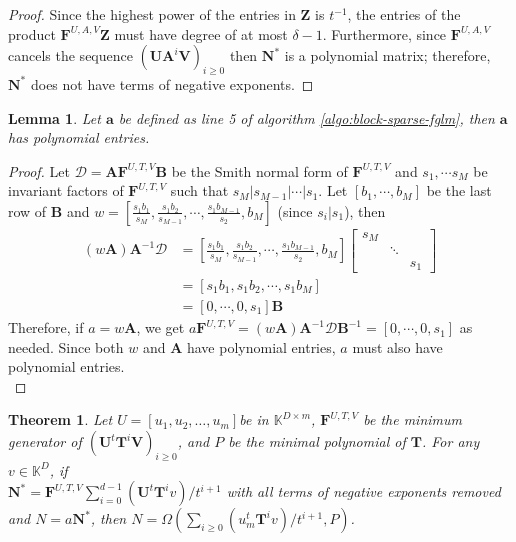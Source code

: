 \documentclass[12pt]{article}
\newtheorem{Lemma}{Lemma}
\def\K {\ensuremath{\mathbb{K}}}
\newtheorem{theorem}[definition]{Theorem}
\def\K{\mathbb{K}}
\def\mA{\mathbf{A}}
\def\mB{\mathbf{B}}
\def\mF{\mathbf{F}}
\def\mN{\mathbf{N}}
\def\mT{\mathbf{T}}
\def\mU{\mathbf{U}}
\def\mV{\mathbf{V}}
\def\mZ{\mathbf{Z}}
\begin{document}
\begin{proof}
	Since the highest power of the entries in $\mZ$ is $t^{-1}$, the 
	entries of the product $\mF^{U,A,V}\mZ$ must have degree of at 
	most $\delta -1$. Furthermore, since $\mF^{U,A,V}$ cancels 
	the sequence $(\mU\mA^i\mV)_{i \ge 0}$ then $\mN^*$ is a
	polynomial matrix;
	therefore, $\mN^*$ does not have terms of negative exponents.
\end{proof}

\begin{Lemma}\label{utilde}
	Let $\textbf{a}$ be defined as line 5 of algorithm \ref{algo:block-sparse-fglm}, 
	then $\textbf{a}$ has polynomial entries.
\end{Lemma}

\begin{proof}
	Let $\mathscr{D} = \mA\mF^{U,T,V}\mB$ be the Smith normal form of $\mF^{U,T,V}$ and $s_1, \cdots s_M$ be
	invariant factors of $\mF^{U,T,V}$ such that 
	$s_M | s_{M-1} | \cdots | s_1$.
	Let $[b_1,\cdots,b_M]$ be the last row of $\mB$ and 
	$w = [\frac{s_1b_1}{s_M},\frac{s_1b_2}{s_{M-1}},\cdots,\frac{s_1b_{M-1}}{s_2},b_M]$ (since $s_i | s_1$), then
	\begin{align*}
	(w \mA) \mA^{-1} \mathscr{D} &=  [\frac{s_1b_1}{s_M},\frac{s_1b_2}{s_{M-1}},\cdots,\frac{s_1b_{M-1}}{s_2},b_M]
	\begin{bmatrix}
	s_M &        & \\
	& \ddots & \\
	&        & s_1
	\end{bmatrix}\\
	&= [s_1b_1, s_1b_2, \cdots, s_1b_M]\\
	&= [0,\cdots,0,s_1] \mB
	\end{align*}
	Therefore, if $a = w \mA$, we get
	$ a \mF^{U,T,V} = (w \mA) \mA^{-1} \mathscr{D} \mB^{-1} = 
	[0,\cdots,0,s_1]$ as needed. Since both $w$ and $\mA$ have polynomial
	entries, $a$ must also have polynomial entries.\\
\end{proof}

\begin{theorem}
	 Let $U = [u_1,u_2,\dots,u_m]$be in $\K^{D\times m}$,
	 $\mF^{U,T,V}$ be the minimum generator of $(\mU^t \mT^i \mV)_{i\ge0}$,
	 and $P$ be the minimal polynomial of $\mT$. For any 
	 $v \in \K^{D}$, if\\ 
	 $\mN^* = \mF^{U,T,V}\sum_{i=0}^{d-1} (\mU^t \mT^i v)/t^{i+1}$ 
	 with all terms of negative exponents removed
	 and $N = a\mN^*$,
	 then $N = \Omega(\sum_{i\ge0}(u_m^t \mT^i v)/t^{i+1},P)$.
	 \label{theorem:anyv}
\end{theorem}
\end{document}
